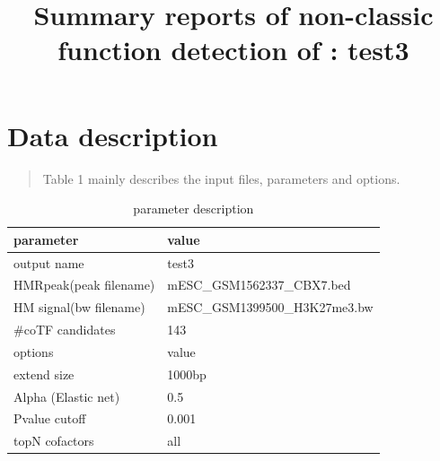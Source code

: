 \documentclass[11pt,a4paper]{article}
\begin{document}
\title{Summary reports of non-classic function detection of : test3}

\vspace{-1cm}
\maketitle
\tableofcontents
\newpage
\newpage
\section{Data description}
\begin{quotation}
Table 1 mainly describes the input files, parameters and options.
\end{quotation}
\begin{table}[h]
\caption{parameter description}\label{bstable}
\begin{tabularx}{\textwidth}{ |X|l| }

      
\hline
parameter & value  \\
\hline
output name & test3 \\
\hline
HMRpeak(peak filename) & mESC\_GSM1562337\_CBX7.bed \\
\hline
HM signal(bw filename) & mESC\_GSM1399500\_H3K27me3.bw  \\
\hline
\#coTF candidates & 143 \\
\hline
options & value \\
\hline
extend size & 1000bp \\
\hline
Alpha (Elastic net) & 0.5 \\
\hline
Pvalue cutoff & 0.001 \\
\hline
topN cofactors & all \\
\hline

\end{tabularx}
\end{table}

\newpage
\newpage
\end{document}
